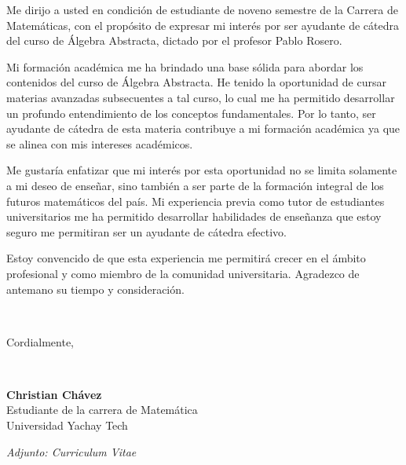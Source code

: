 \documentclass[11pt,a4paper,sans]{moderncv}        %
\begin{document}
Me dirijo a usted en condición de estudiante de noveno semestre de la Carrera de Matemáticas, con el propósito de expresar mi interés por ser ayudante de cátedra del curso de Álgebra Abstracta, dictado por el profesor Pablo Rosero.


Mi formación académica  me ha brindado una base sólida para abordar los contenidos del curso de Álgebra Abstracta. He tenido la oportunidad de cursar materias avanzadas subsecuentes a tal curso, lo cual me ha permitido desarrollar un profundo entendimiento de los conceptos fundamentales. Por lo tanto, ser ayudante de cátedra de esta materia contribuye a mi formación académica ya que se alinea con mis intereses académicos.


Me gustaría enfatizar que mi interés por esta oportunidad no se limita solamente a mi deseo de enseñar, sino también a ser parte de la formación integral de los futuros matemáticos del país. Mi experiencia previa como tutor de estudiantes universitarios me ha permitido desarrollar habilidades de  enseñanza que estoy seguro me permitiran ser un ayudante de cátedra efectivo. 


Estoy convencido de que esta experiencia me permitirá crecer en el ámbito profesional y como  miembro de la comunidad universitaria.
Agradezco de antemano su tiempo y consideración.

~

Cordialmente,

~

\textbf{Christian Chávez}\\
Estudiante de la carrera de Matemática\\
Universidad Yachay Tech 

\vspace{10\baselineskip}


\textit{Adjunto: Curriculum Vitae}



 
\end{document}
